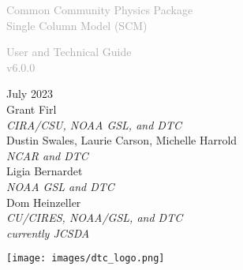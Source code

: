 \begin{titlepage}
\renewcommand{\thefootnote}{\fnsymbol{footnote}}

\vspace*{1em}
\noindent

\begin{center}
\textcolor{darkgray}{\bigsf Common Community Physics Package\\[0.5ex] Single Column Model (SCM)}
\vspace*{1em}\par

\textcolor{darkgray}{\bigst User and Technical Guide\\[0.5ex] v6.0.0}
\vspace*{1em}\par

\large{July 2023}\\

Grant Firl\\
\textit{\small{CIRA/CSU, NOAA GSL, and DTC}}\\[4em]

Dustin Swales, Laurie Carson, Michelle Harrold\\
\textit{\small{NCAR and DTC}}\\[4em]

Ligia Bernardet\\
\textit{\small{NOAA GSL and DTC}}\\[4em]

Dom Heinzeller\\
\textit{\small{CU/CIRES, NOAA/GSL, and DTC}}\\
\textit{\small{currently JCSDA}}\\[4em]

\vspace{3em}

\texttt{[image: images/dtc\_logo.png]}\\[2em]

\end{center}
\end{titlepage}
\pagebreak{}
